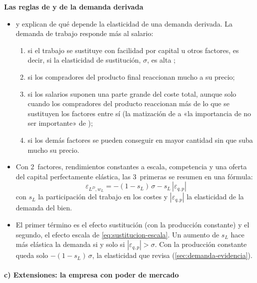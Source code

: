 \documentclass[11pt]{article}
\begin{document}
\begin{anotaciones}
\textbf{Las reglas de  y  de la demanda derivada}

\begin{itemize}
\item \textcite[libro~V, cap.~VI]{Marshall1890Principles} y \textcite[apéndice]{Hicks1932Theory} explican de qué depende la elasticidad de una demanda derivada. La demanda de trabajo responde más al salario:
  \begin{enumerate}
  \item si el trabajo se sustituye con facilidad por capital u otros factores, es decir, si la elasticidad de sustitución, $\sigma$, es alta ;
  \item si los compradores del producto final reaccionan mucho a su precio;
  \item si los salarios suponen una parte grande del coste total, aunque solo cuando los compradores del producto reaccionan más de lo que se sustituyen los factores entre sí (la matización de  a «la importancia de no ser importante» de );
  \item si los demás factores se pueden conseguir en mayor cantidad sin que suba mucho su precio.
  \end{enumerate}
\item Con 2~factores, rendimientos constantes a escala, competencia y una oferta del capital perfectamente elástica, las 3~primeras se resumen en una fórmula\nocite{Hamermesh1993Labor}:
  \[
  \varepsilon_{L^D,w_L}=-(1-s_L)\,\sigma-s_L\,|\varepsilon_{q,p}|
  \]
  con $s_L$ la participación del trabajo en los costes y $|\varepsilon_{q,p}|$ la elasticidad de la demanda del bien.
\item El primer término es el efecto sustitución (con la producción constante) y el segundo, el efecto escala de \eqref{eq:sustitucion-escala}. Un aumento de $s_L$ hace más elástica la demanda si y solo si $|\varepsilon_{q,p}|>\sigma$. Con la producción constante queda solo $-(1-s_L)\,\sigma$, la elasticidad que revisa \textcite{Hamermesh1993Labor} (\ref{sec:demanda-evidencia}).
\end{itemize}
\end{anotaciones}

\paragraph{c) Extensiones: la empresa con poder de mercado}\label{sec:demanda-extensiones}
\end{document}
